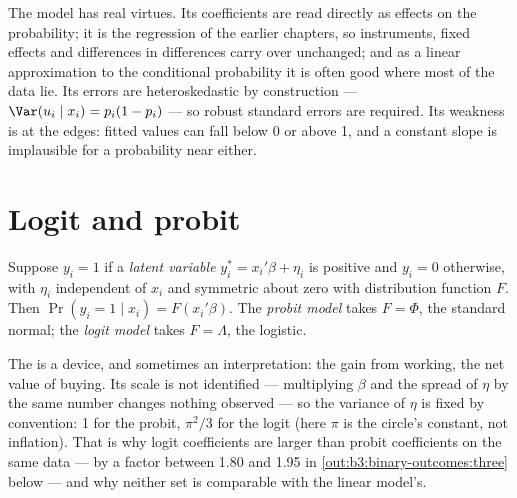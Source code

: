 The model has real virtues. Its coefficients are read directly as effects on the
probability; it is the regression of the earlier chapters, so instruments, fixed
effects and differences in differences carry over unchanged; and as a linear
approximation to the conditional probability it is often good where most of the
data lie. Its errors are heteroskedastic by construction --- $\Var(u_i \mid
x_i) = p_i(1 - p_i)$ --- so robust standard errors are required. Its weakness is
at the edges: fitted values can fall below 0 or above 1, and a constant slope
is implausible for a probability near either.

\section{Logit and probit}\label{sec:b3:binary-outcomes:logit-probit}

\begin{definition}\label{def:b3:binary-outcomes:logit-probit}
Suppose $y_i = 1$ if a \emph{latent variable} $y_i^* = x_i'\beta + \eta_i$ is
positive and $y_i = 0$ otherwise, with $\eta_i$ independent of $x_i$ and
symmetric about zero with distribution function $F$. Then $\Pr(y_i = 1 \mid x_i)
= F(x_i'\beta)$. The \emph{probit model} takes $F = \Phi$, the standard normal;
the \emph{logit model} takes $F = \Lambda$, the logistic.
\end{definition}

The  is a device, and sometimes an interpretation: the gain from
working, the net value of buying. Its scale is not identified --- multiplying
$\beta$ and the spread of $\eta$ by the same number changes nothing observed ---
so the variance of $\eta$ is fixed by convention: 1 for the probit, $\pi^2/3$ for
the logit (here $\pi$ is the circle's constant, not inflation). That is why logit
coefficients are larger than probit coefficients on the same data --- by a factor
between 1.80 and 1.95 in \cref{out:b3:binary-outcomes:three} below --- and why
neither set is comparable with the linear model's.

